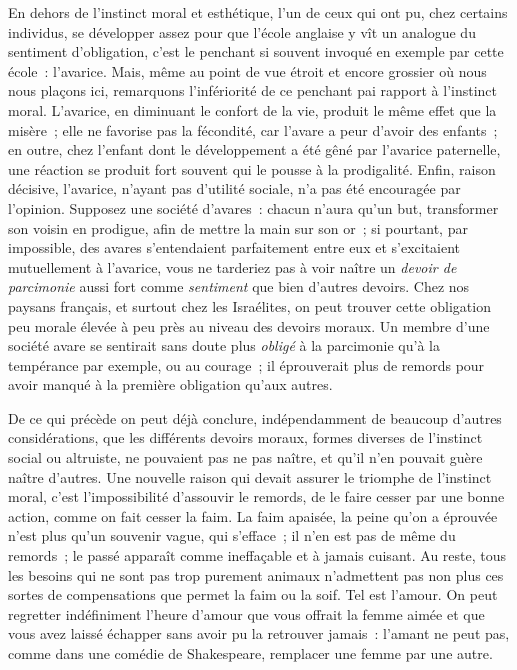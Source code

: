 \documentclass[french,twoside]{book} %
\begin{document}
En dehors de l’instinct moral et esthétique, l’un de ceux qui ont pu, chez certains individus, se développer assez pour que l’école anglaise y vît un analogue du sentiment d’obligation, c’est le penchant si souvent invoqué en exemple par cette école : l’avarice. Mais, même au point de vue étroit et encore grossier où nous nous plaçons ici, remarquons l’infériorité de ce penchant pai rapport à l’instinct moral. L’avarice, en diminuant le confort de la vie, produit le même effet que la misère ; elle ne favorise pas la fécondité, car l’avare a peur d’avoir des enfants ; en outre, chez l’enfant dont le développement a été gêné par l’avarice paternelle, une réaction se produit fort souvent qui le pousse à la prodigalité. Enfin, raison décisive, l’avarice, n’ayant pas d’utilité sociale, n’a pas été encouragée par l’opinion. Supposez une société d’avares : chacun n’aura qu’un but, transformer son voisin en prodigue, afin de mettre la main sur son or ; si pourtant, par impossible, des avares s’entendaient parfaitement entre eux et s’excitaient mutuellement à l’avarice, vous ne tarderiez pas à voir naître un \emph{devoir de parcimonie} aussi fort comme \emph{sentiment} que bien d’autres devoirs. Chez nos paysans français, et surtout chez les Israélites, on peut trouver cette obligation peu morale élevée à peu près au niveau des devoirs moraux. Un membre d’une société avare se sentirait sans doute plus \emph{obligé} à la parcimonie qu’à la tempérance par exemple, ou au courage ; il éprouverait plus de remords pour avoir manqué à la première obligation qu’aux autres.\par
De ce qui précède on peut déjà conclure, indépendamment de beaucoup d’autres considérations, que les différents devoirs moraux, formes diverses de l’instinct social ou altruiste, ne pouvaient pas ne pas naître, et qu’il n’en pouvait guère naître d’autres. Une nouvelle raison qui devait assurer le triomphe de l’instinct moral, c’est l’impossibilité d’assouvir le remords, de le faire cesser par une bonne action, comme on fait cesser la faim. La faim apaisée, la peine qu’on a éprouvée n’est plus qu’un souvenir vague, qui s’efface ; il n’en est pas de même du remords ; le passé apparaît comme ineffaçable et à jamais cuisant. Au reste, tous les besoins qui ne sont pas trop purement animaux n’admettent pas non plus ces sortes de compensations que permet la faim ou la soif. Tel est l’amour. On peut regretter indéfiniment l’heure d’amour que vous offrait la femme aimée et que vous avez laissé échapper sans avoir pu la retrouver jamais : l’amant ne peut pas, comme dans une comédie de Shakespeare, remplacer une femme par une autre.\par
\end{document}
